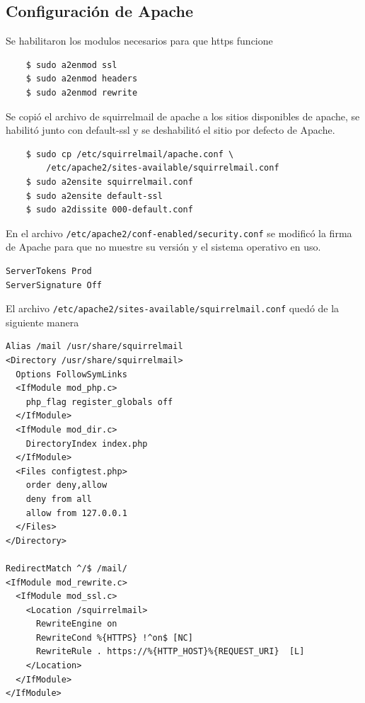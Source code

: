 \documentclass[9pt]{article}
\begin{document}

\subsection{Configuración de Apache}

Se habilitaron los modulos necesarios para que \textsf{https} funcione \\
\begin{verbatim}
    $ sudo a2enmod ssl
    $ sudo a2enmod headers
    $ sudo a2enmod rewrite
\end{verbatim}

Se copió el archivo de squirrelmail de apache a los sitios disponibles de apache, se habilitó junto con \textsf{default-ssl} y se deshabilitó el sitio por defecto de Apache. \\
\begin{verbatim}
    $ sudo cp /etc/squirrelmail/apache.conf \
        /etc/apache2/sites-available/squirrelmail.conf
    $ sudo a2ensite squirrelmail.conf
    $ sudo a2ensite default-ssl
    $ sudo a2dissite 000-default.conf
\end{verbatim}

En el archivo \texttt{/etc/apache2/conf-enabled/security.conf} se modificó la firma de Apache para que no muestre su versión y el sistema operativo en uso. \\
\begin{verbatim}
ServerTokens Prod
ServerSignature Off
\end{verbatim}

El archivo \texttt{/etc/apache2/sites-available/squirrelmail.conf} quedó de la siguiente manera
\begin{verbatim}
Alias /mail /usr/share/squirrelmail
<Directory /usr/share/squirrelmail>
  Options FollowSymLinks
  <IfModule mod_php.c>
    php_flag register_globals off
  </IfModule>
  <IfModule mod_dir.c>
    DirectoryIndex index.php
  </IfModule>
  <Files configtest.php>
    order deny,allow
    deny from all
    allow from 127.0.0.1
  </Files>
</Directory>

RedirectMatch ^/$ /mail/
<IfModule mod_rewrite.c>
  <IfModule mod_ssl.c>
    <Location /squirrelmail>
      RewriteEngine on
      RewriteCond %{HTTPS} !^on$ [NC]
      RewriteRule . https://%{HTTP_HOST}%{REQUEST_URI}  [L]
    </Location>
  </IfModule>
</IfModule>
\end{verbatim}
\end{document}
